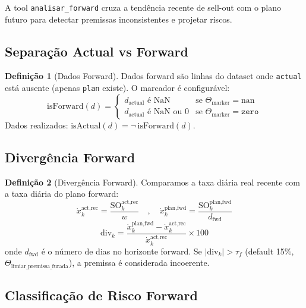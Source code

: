 \documentclass[a4paper, 12pt]{report}
\theoremstyle{definition}
\newtheorem{definicao}{Defini\c{c}\~ao}[chapter]
\theoremstyle{remark}
\begin{document}
A tool \texttt{analisar\_forward} cruza a tend\^encia recente de sell-out
com o plano futuro para detectar premissas inconsistentes e projetar riscos.

\subsection{Separa\c{c}\~ao Actual vs Forward}

\begin{definicao}[Dados Forward]
  Dados forward s\~ao linhas do dataset onde \texttt{actual} est\'a ausente
  (apenas \texttt{plan} existe). O marcador \'e configur\'avel:
  \[
    \text{isForward}(d) = \begin{cases}
      d_{\text{actual}} \text{ \'e NaN} & \text{se } \Theta_{\text{marker}} = \text{nan} \\
      d_{\text{actual}} \text{ \'e NaN ou } 0 & \text{se } \Theta_{\text{marker}} = \texttt{zero}
    \end{cases}
  \]
  Dados realizados: $\text{isActual}(d) = \neg\,\text{isForward}(d)$.
\end{definicao}

\subsection{Diverg\^encia Forward}

\begin{definicao}[Diverg\^encia Forward]
  Comparamos a taxa di\'aria real recente com a taxa di\'aria do plano forward:
  \[
    \dot{x}^{\text{act,rec}}_k = \frac{\text{SO}^{\text{act,rec}}_k}{w}
    \quad,\quad
    \dot{x}^{\text{plan,fwd}}_k = \frac{\text{SO}^{\text{plan,fwd}}_k}{d_{\text{fwd}}}
  \]
  \[
    \text{div}_k = \frac{\dot{x}^{\text{plan,fwd}}_k - \dot{x}^{\text{act,rec}}_k}
                        {\dot{x}^{\text{act,rec}}_k} \times 100
  \]
  onde $d_{\text{fwd}}$ \'e o n\'umero de dias no horizonte forward.
  Se $|\text{div}_k| > \tau_f$ (default 15\%, $\Theta_{\text{limiar\_premissa\_furada}}$),
  a premissa \'e considerada incoerente.
\end{definicao}

\subsection{Classifica\c{c}\~ao de Risco Forward}
\end{document}
